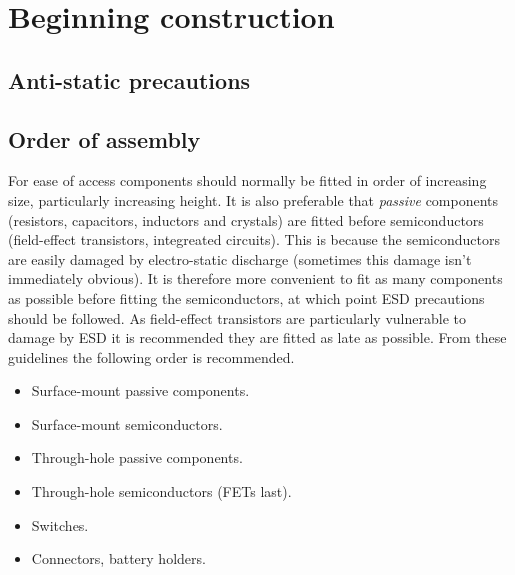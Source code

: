\chapter{Beginning construction}

\section{Anti-static precautions}

\section{Order of assembly}

For ease of access components should normally be fitted in order of
increasing size, particularly increasing height. It is also preferable
that \emph{passive} components (resistors, capacitors, inductors and
crystals) are fitted before semiconductors (field-effect transistors,
integreated circuits). This is because the semiconductors are easily
damaged by electro-static discharge (sometimes this damage isn't
immediately obvious). It is therefore more convenient to fit as many
components as possible before fitting the semiconductors, at which
point ESD precautions should be followed. As field-effect transistors
are particularly vulnerable to damage by ESD it is recommended they
are fitted as late as possible.
From these guidelines the
following order is recommended.
\begin{itemize}
\item Surface-mount passive components.
\item Surface-mount semiconductors.
\item Through-hole passive components.
\item Through-hole semiconductors (FETs last).
\item Switches.
\item Connectors, battery holders.
\end{itemize}
